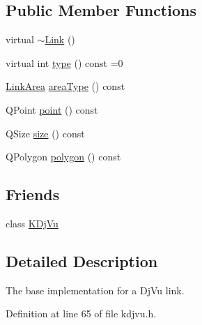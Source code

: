 \subsection*{Public Member Functions}
\begin{DoxyCompactItemize}
\item 
virtual \hyperlink{classKDjVu_1_1Link_a739d79ef647905dd341c3cd2499095ab}{$\sim$\+Link} ()
\item 
virtual int \hyperlink{classKDjVu_1_1Link_ac25a9e93e099d74ea3f2dca8d774d7e0}{type} () const =0
\item 
\hyperlink{classKDjVu_1_1Link_ae7930012fef50123e69d2c97897afd9a}{Link\+Area} \hyperlink{classKDjVu_1_1Link_ab4c915079557e3915aa4a823bf692095}{area\+Type} () const 
\item 
Q\+Point \hyperlink{classKDjVu_1_1Link_ac5b26fabaa557a48ef841acf3f9c92f2}{point} () const 
\item 
Q\+Size \hyperlink{classKDjVu_1_1Link_a56cdee5de83866c1fd961d016e579c2a}{size} () const 
\item 
Q\+Polygon \hyperlink{classKDjVu_1_1Link_aaa0b49aeb9dcab29ef72831ba8665bd8}{polygon} () const 
\end{DoxyCompactItemize}
\subsection*{Friends}
\begin{DoxyCompactItemize}
\item 
class \hyperlink{classKDjVu_1_1Link_a4241ce0336d22245ffdb13dd5cb6edcc}{K\+Dj\+Vu}
\end{DoxyCompactItemize}


\subsection{Detailed Description}
The base implementation for a Dj\+Vu link. 

Definition at line 65 of file kdjvu.\+h.



